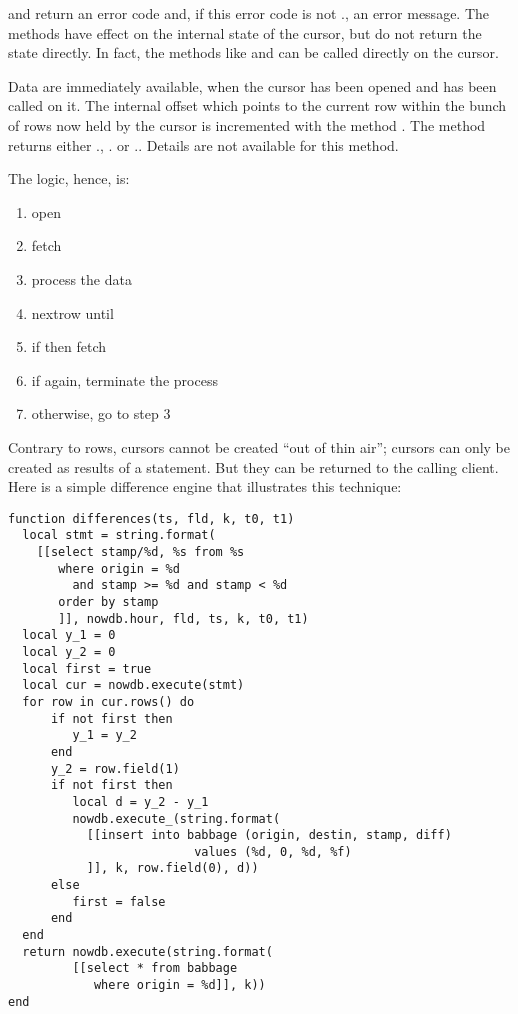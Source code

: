  and  return an error code
and, if this error code is not .,
an error message. The methods have effect on
the internal state of the cursor, but do not return
the state directly. In fact, the  methods
like  and  can be called
directly on the cursor.

Data are immediately available,
when the cursor has been opened and 
has been called on it.
The internal offset which points to the current row
within the bunch of rows now held by the cursor is
incremented with the method .
The method returns either
.,
.
or ..
Details are not available for this method.

\begin{minipage}{\textwidth}
The logic, hence, is:
\begin{enumerate}
\item open
\item fetch
\item process the data
\item nextrow until 
\item if  then fetch
\item if  again, terminate the process
\item otherwise, go to step 3 
\end{enumerate}
\end{minipage}

Contrary to rows, cursors cannot be created
``out of thin air''; cursors can only be created
as results of a  statement.
But they can be returned to the calling client.
Here is a simple difference engine that
illustrates this technique:

\begin{lua}
\begin{lstlisting}
function differences(ts, fld, k, t0, t1)
  local stmt = string.format(
    [[select stamp/%d, %s from %s
       where origin = %d
         and stamp >= %d and stamp < %d
       order by stamp
       ]], nowdb.hour, fld, ts, k, t0, t1)
  local y_1 = 0
  local y_2 = 0
  local first = true
  local cur = nowdb.execute(stmt)
  for row in cur.rows() do
      if not first then
         y_1 = y_2
      end
      y_2 = row.field(1)
      if not first then
         local d = y_2 - y_1
         nowdb.execute_(string.format(
           [[insert into babbage (origin, destin, stamp, diff)
                          values (%d, 0, %d, %f)
           ]], k, row.field(0), d))
      else
         first = false
      end
  end
  return nowdb.execute(string.format(
         [[select * from babbage
            where origin = %d]], k))
end
\end{lstlisting}
\end{lua}

